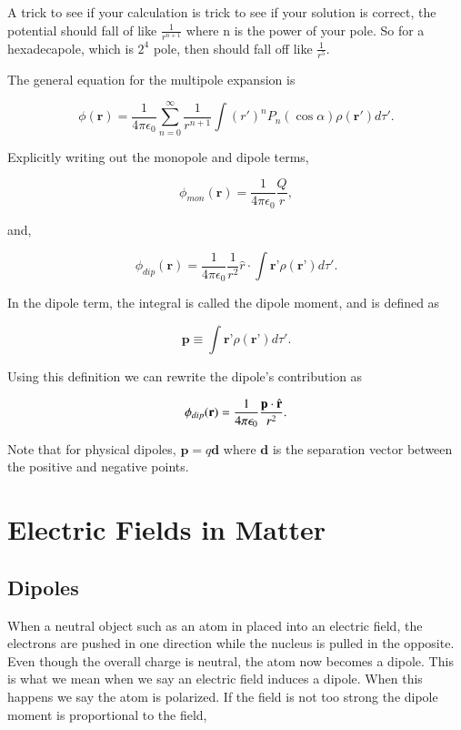 \documentclass[preprint, review,12pt]{elsarticle}
\def\k{\frac{1}{4 \pi \epsilon_0}}
\def\.{\cdot}
\def\b{\textbf}
\def\={\equiv}
\begin{document}
A trick to see if your calculation is trick to see if your solution is correct, the potential should fall of like $\frac{1}{r^{n+1}}$ where n is the power of your pole. So for a hexadecapole, which is $2^4$ pole, then should fall off like $\frac{1}{r^5}$.

The general equation for the multipole expansion is

\begin{equation}
    \phi(\b{r}) = \frac{1}{4\pi \epsilon_0} \sum_{n=0}^\infty \frac{1}{r^{n+1}} \int (r')^n P_n(\cos \alpha ) \rho(\b{r}')d\tau'.
\end{equation}


Explicitly writing out the monopole and dipole terms,

\begin{equation}
    \phi_{mon}(\b{r}) = \k \frac{Q}{r},
\end{equation}

and,

\begin{equation}
    \phi_{dip}(\b{r}) = \frac{1}{4 \pi \epsilon_0}\frac{1}{r^2}\hat{r}\. \int \b{r'}\rho(\b{r'})d\tau'.
\end{equation}

In the dipole term, the integral is called the dipole moment, and is defined as

\begin{equation}
    \b{p} \= \int\b{r'} \rho(\b{r'})d\tau'.
\end{equation}

Using this definition we can rewrite the dipole's contribution as

\begin{equation}
    \phi_{dip}(\b{r}) = \k\frac{\b{p}\. \hat{\b r}}{r^2}.
\end{equation}

Note that for physical dipoles, $\b{p} = q\b{d}$ where $\b{d}$ is the separation vector between the positive and negative points.

\section{Electric Fields in Matter}

\subsection{Dipoles}

When a neutral object such as an atom in placed into an electric field, the electrons are pushed in one direction while the nucleus is pulled in the opposite. Even though the overall charge is neutral, the atom now becomes a dipole. This is what we mean when we say an electric field induces a dipole. When this happens we say the atom is polarized. If the field is not too strong the dipole moment is proportional to the field,
\end{document}
